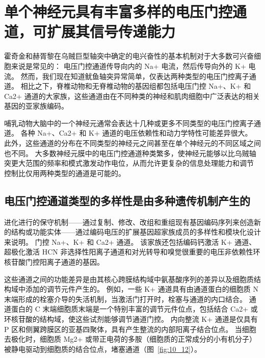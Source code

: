 \section{单个神经元具有丰富多样的电压门控通道，可扩展其信号传递能力}

霍奇金和赫胥黎在乌贼巨型轴突中确定的电兴奋性的基本机制对于大多数可兴奋细胞来说是常见的：
电压门控通道传导向内的 Na+ 电流，然后传导向外的 K+ 电流。
然而，我们现在知道鱿鱼轴突异常简单，仅表达两种类型的电压门控离子通道。
相比之下，脊椎动物和无脊椎动物的基因组都包括电压门控 Na+、K+ 和 Ca2+ 通道的大家族，这些通道由在不同种类的神经和肌肉细胞中广泛表达的相关基因的亚家族编码。


哺乳动物大脑中的一个神经元通常会表达十几种或更多不同类型的电压门控离子通道。
各种 Na+、Ca2+ 和 K+ 通道的电压依赖性和动力学特性可能差异很大。
此外，这些通道的分布在不同类型的神经元之间甚至在单个神经元的不同区域之间也不同。
大多数神经元膜中的电压门控通道种类繁多，使神经元能够以比乌贼轴突更大范围的频率和模式激发动作电位，从而允许更复杂的信息处理能力和调节 控制比仅用两种类型的通道是可能的。



\subsection{电压门控通道类型的多样性是由多种遗传机制产生的}

进化进行的保守机制——通过复制、修改、改组和重组现有基因编码序列来创造新的结构或功能实体——通过编码电压的扩展基因超家族成员的多样性和模块化设计来说明。 
门控 Na+、K+ 和 Ca2+ 通道。
该家族还包括编码钙激活 K+ 通道、超极化激活 HCN 非选择性阳离子通道和对光转导和嗅觉很重要的电压非依赖性环核苷酸门控阳离子通道的基因。


这些通道之间的功能差异是由其核心跨膜结构域中氨基酸序列的差异以及细胞质结构域中添加的调节元件产生的。 
例如，一些 K+ 通道具有由通道蛋白的细胞质 N 末端形成的栓塞介导的失活机制，当激活门打开时，栓塞与通道的内口结合。
通道蛋白的 C 末端细胞质末端是一个特别丰富的调节元件位点，包括结合 Ca2+ 或环核苷酸的结构域，使这些试剂能够调节通道门控。
内向整流 K+ 通道是仅具有 P 区和侧翼跨膜区的亚基四聚体，具有产生整流的内部阳离子结合位点。
当细胞去极化时，细胞质 Mg2+ 或带正电荷的多胺（细胞质的正常成分的小有机分子）被静电驱动到细胞质的结合位点，堵塞通道（图~\ref{fig:10_12}）。


